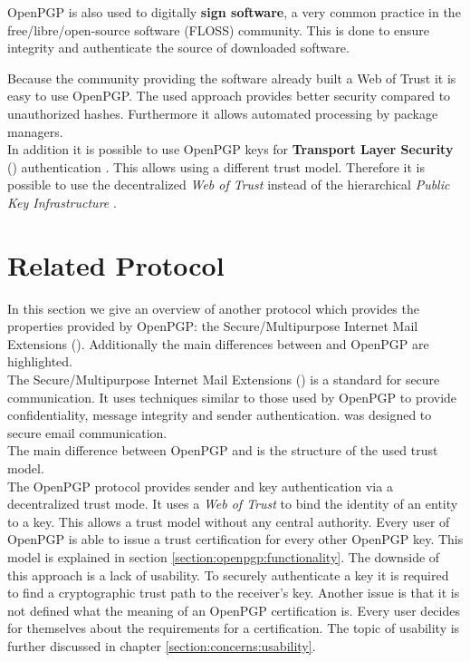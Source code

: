 OpenPGP is also used to digitally \textbf{sign software}, a very common practice in the free/libre/open-source software (FLOSS) community. This is done to ensure integrity and authenticate the source of downloaded software. 

Because the community providing the software already built a Web of Trust it is easy to use OpenPGP. The used approach provides better security compared to unauthorized hashes. Furthermore it allows automated processing by package managers. \\

In addition it is possible to use OpenPGP keys for \textbf{Transport Layer Security} () authentication \cite{RFC6091}. This allows using a different trust model. Therefore it is possible to use the decentralized \textit{Web of Trust} instead of the hierarchical \textit{Public Key Infrastructure} \citep{RFC5280}. 

\section{Related Protocol} \label{section:openpgp:smime}

In this section we give an overview of another protocol which provides the properties provided by OpenPGP: the Secure/Multipurpose Internet Mail Extensions (). Additionally the main differences between  and OpenPGP are highlighted. \\

The Secure/Multipurpose Internet Mail Extensions () \citep{RFC5751} is a standard for secure communication. It uses techniques similar to those used by OpenPGP to provide confidentiality, message integrity and sender authentication.  was designed to secure email communication.  \\

The main difference between OpenPGP and  is the structure of the used trust model.  \\

The {OpenPGP} protocol provides sender and key authentication via a decentralized trust mode. It uses a \textit{Web of Trust} to bind the identity of an entity to a key. This allows a trust model without any central authority. Every user of OpenPGP is able to issue a trust certification for every other OpenPGP key. This model is explained in section \ref{section:openpgp:functionality}. The downside of this approach is a lack of usability. To securely authenticate a key it is required to find a cryptographic trust path to the receiver's key. Another issue is that it is not defined what the meaning of an OpenPGP certification is. Every user decides for themselves about the requirements for a certification. The topic of usability is further discussed in chapter \ref{section:concerns:usability}. \\

